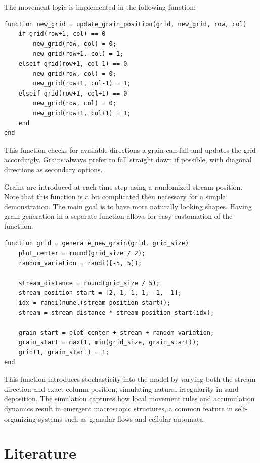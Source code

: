 \documentclass{article}
\begin{document}
The movement logic is implemented in the following function:
\newpage
\begin{lstlisting}[caption={Grain movement function}]
function new_grid = update_grain_position(grid, new_grid, row, col)
    if grid(row+1, col) == 0
        new_grid(row, col) = 0;
        new_grid(row+1, col) = 1;
    elseif grid(row+1, col-1) == 0
        new_grid(row, col) = 0;
        new_grid(row+1, col-1) = 1;
    elseif grid(row+1, col+1) == 0
        new_grid(row, col) = 0;
        new_grid(row+1, col+1) = 1;
    end
end
\end{lstlisting}

This function checks for available directions a grain can fall and updates the grid accordingly. Grains always prefer to fall straight down if possible, with diagonal directions as secondary options.

Grains are introduced at each time step using a randomized stream position. Note that this function is a bit complicated then necessary for a simple demonstration. The main goal is to have more naturally looking shapes. Having grain generation in a separate function allows for easy customation of the functuon. 

\begin{lstlisting}[caption={Grain generation function}]
function grid = generate_new_grain(grid, grid_size)
    plot_center = round(grid_size / 2);
    random_variation = randi([-5, 5]);

    stream_distance = round(grid_size / 5);
    stream_position_start = [2, 1, 1, 1, -1, -1];
    idx = randi(numel(stream_position_start));
    stream = stream_distance * stream_position_start(idx);

    grain_start = plot_center + stream + random_variation;
    grain_start = max(1, min(grid_size, grain_start));
    grid(1, grain_start) = 1;
end
\end{lstlisting}

This function introduces stochasticity into the model by varying both the stream direction and exact column position, simulating natural irregularity in sand deposition. The simulation captures how local movement rules and accumulation dynamics result in emergent macroscopic structures, a common feature in self-organizing systems such as granular flows and cellular automata.

\section{Literature}
\end{document}
